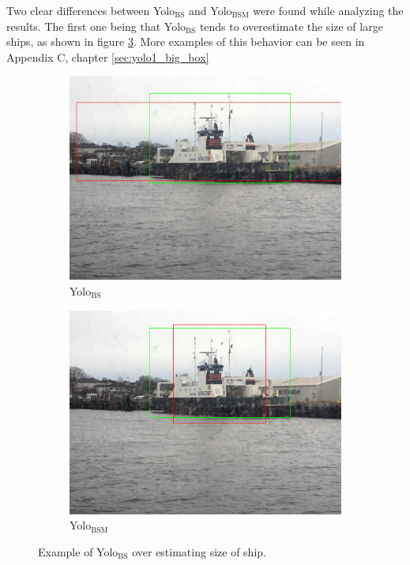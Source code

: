 \vspace{3mm}
\noindent
Two clear differences between Yolo$_{\text{BS}}$ and Yolo$_{\text{BSM}}$ were found while analyzing the results. The first one being that Yolo$_{\text{BS}}$ tends to overestimate the size of large ships, as shown in figure \ref{fig:yolo12_big}. More examples of this behavior can be seen in Appendix C, chapter \ref{sec:yolo1_big_box}

\begin{figure}[h!]
\begin{subfigure}{.5\textwidth}
  \centering
  \includegraphics[width=0.8\linewidth]{results/case_tr_moor/yolo12/yolo1/big/IMG_2566.jpg}
  \caption{Yolo$_{\text{BS}}$}
  \label{fig:yolo1_big}
\end{subfigure}%
\begin{subfigure}{.5\textwidth}
  \centering
  \includegraphics[width=.8\linewidth]{results/case_tr_moor/yolo12/yolo2/big/IMG_2566.jpg}
  \caption{Yolo$_{\text{BSM}}$}
  \label{fig:yolo2_big}
\end{subfigure}
\caption{Example of Yolo$_{\text{BS}}$ over estimating size of ship.}
\label{fig:yolo12_big}
\end{figure}

